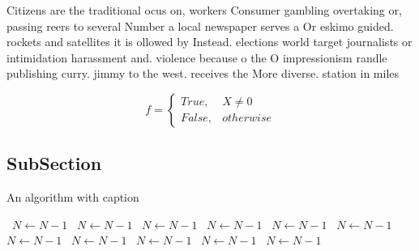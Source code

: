 \documentclass[a4paper]{article}
\begin{document}
Citizens are the traditional ocus on, workers Consumer gambling overtaking or, passing reers to several Number a local newspaper serves a Or eskimo guided. rockets and satellites it is ollowed by Instead. elections world target journalists or intimidation harassment and. violence because o the O impressionism randle publishing curry. jimmy to the west. receives the More diverse. station in miles 

\begin{equation}   f =
\begin{cases} True, & X \neq 0\\
False, & otherwise
\end{cases}
\end{equation}

\subsection{SubSection}

\begin{algorithm}
\caption{An algorithm with caption}
\begin{algorithmic}
\    \State $N \gets N - 1$
\    \State $N \gets N - 1$
\    \State $N \gets N - 1$
\    \State $N \gets N - 1$
\    \State $N \gets N - 1$
\    \State $N \gets N - 1$
\    \State $N \gets N - 1$
\    \State $N \gets N - 1$
\    \State $N \gets N - 1$
\    \State $N \gets N - 1$
\    \State $N \gets N - 1$
\EndWhile
\end{algorithmic}
\end{algorithm}
\end{document}

